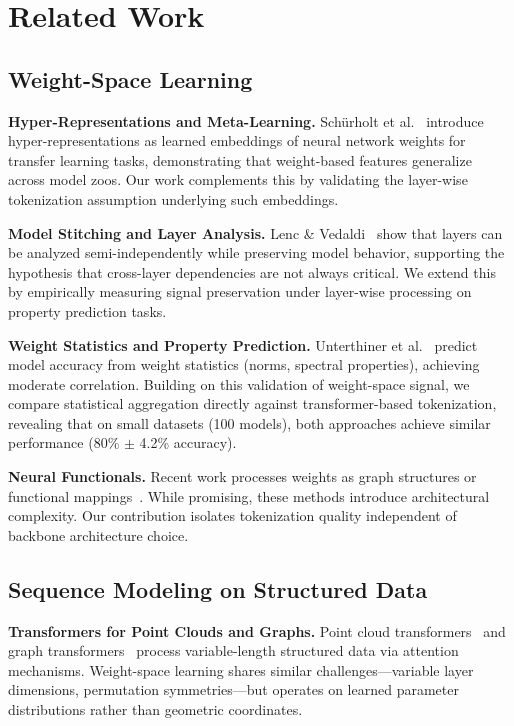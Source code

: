 \section{Related Work}

\subsection{Weight-Space Learning}

\textbf{Hyper-Representations and Meta-Learning.} Schürholt et al.~\cite{schurholt2022hyper} introduce hyper-representations as learned embeddings of neural network weights for transfer learning tasks, demonstrating that weight-based features generalize across model zoos. Our work complements this by validating the layer-wise tokenization assumption underlying such embeddings.

\textbf{Model Stitching and Layer Analysis.} Lenc \& Vedaldi~\cite{lenc2015understanding} show that layers can be analyzed semi-independently while preserving model behavior, supporting the hypothesis that cross-layer dependencies are not always critical. We extend this by empirically measuring signal preservation under layer-wise processing on property prediction tasks.

\textbf{Weight Statistics and Property Prediction.} Unterthiner et al.~\cite{unterthiner2020predicting} predict model accuracy from weight statistics (norms, spectral properties), achieving moderate correlation. Building on this validation of weight-space signal, we compare statistical aggregation directly against transformer-based tokenization, revealing that on small datasets (100 models), both approaches achieve similar performance (80\% $\pm$ 4.2\% accuracy).

\textbf{Neural Functionals.} Recent work processes weights as graph structures or functional mappings~\cite{navon2023equivariant,zhou2022neural}. While promising, these methods introduce architectural complexity. Our contribution isolates tokenization quality independent of backbone architecture choice.

\subsection{Sequence Modeling on Structured Data}

\textbf{Transformers for Point Clouds and Graphs.} Point cloud transformers~\cite{zhao2021point} and graph transformers~\cite{dwivedi2021generalization} process variable-length structured data via attention mechanisms. Weight-space learning shares similar challenges---variable layer dimensions, permutation symmetries---but operates on learned parameter distributions rather than geometric coordinates.

